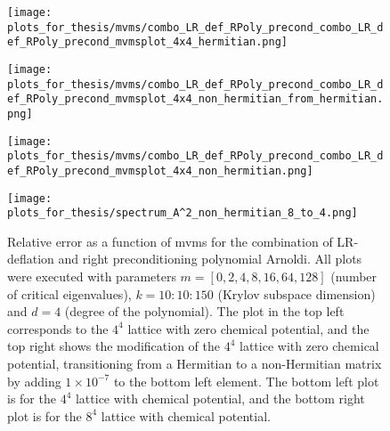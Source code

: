 \begin{figure}[H]
    \centering
    \begin{minipage}{0.45\textwidth}
        \centering
        \texttt{[image: plots\_for\_thesis/mvms/combo\_LR\_def\_RPoly\_precond\_combo\_LR\_def\_RPoly\_precond\_mvmsplot\_4x4\_hermitian.png]} %
    \end{minipage}%
    \hspace{0.02\textwidth} %
    \begin{minipage}{0.45\textwidth}
        \centering
        \texttt{[image: plots\_for\_thesis/mvms/combo\_LR\_def\_RPoly\_precond\_combo\_LR\_def\_RPoly\_precond\_mvmsplot\_4x4\_non\_hermitian\_from\_hermitian.png]} %
    \end{minipage}
    
    \vspace{0.02\textwidth} %
    
    \begin{minipage}{0.45\textwidth}
        \centering
        \texttt{[image: plots\_for\_thesis/mvms/combo\_LR\_def\_RPoly\_precond\_combo\_LR\_def\_RPoly\_precond\_mvmsplot\_4x4\_non\_hermitian.png]} %
    \end{minipage}%
    \hspace{0.02\textwidth} %
    \begin{minipage}{0.45\textwidth}
        \centering
        \texttt{[image: plots\_for\_thesis/spectrum\_A^2\_non\_hermitian\_8\_to\_4.png]} %
    \end{minipage}
    
    \caption{\small Relative error as a function of mvms for the combination of LR-deflation and right preconditioning polynomial Arnoldi. All plots were executed with parameters $m = [0, 2, 4, 8, 16, 64, 128]$ (number of critical eigenvalues), $k = 10:10:150$ (Krylov subspace dimension) and $d = 4$ (degree of the polynomial). The plot in the top left corresponds to the $4^4$ lattice with zero chemical potential, and the top right shows the modification of the $4^4$ lattice with zero chemical potential, transitioning from a Hermitian to a non-Hermitian matrix by adding $1 \times 10^{-7}$ to the bottom left element. The bottom left plot is for the $4^4$ lattice with chemical potential, and the bottom right plot is for the $8^4$ lattice with chemical potential.}
    \label{fig:combo_LR+right_pre_cond_mvms_plot}
\end{figure}

